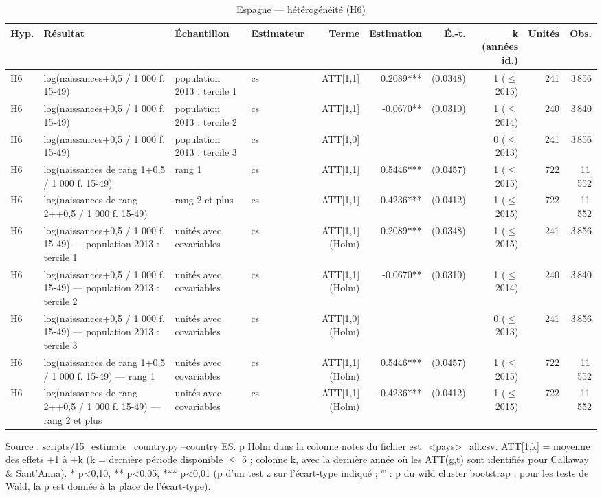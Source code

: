 \begin{table}\centering
\begin{threeparttable}
\caption{Espagne — hétérogénéité (H6)}\label{tab:es_h6}
\scriptsize
\begin{tabular}{lp{7.5cm}llrrrrrr}
\toprule
Hyp. & Résultat & Échantillon & Estimateur & Terme & Estimation & É.-t. & k (années id.) & Unités & Obs. \\
\midrule
H6 & log(naissances+0,5 / 1 000 f. 15-49) & population 2013 : tercile 1 & cs & ATT[1,1] & 0.2089*** & (0.0348) & 1 ($\leq$ 2015) & 241 & 3\,856 \\
H6 & log(naissances+0,5 / 1 000 f. 15-49) & population 2013 : tercile 2 & cs & ATT[1,1] & -0.0670** & (0.0310) & 1 ($\leq$ 2014) & 240 & 3\,840 \\
H6 & log(naissances+0,5 / 1 000 f. 15-49) & population 2013 : tercile 3 & cs & ATT[1,0] &  &  & 0 ($\leq$ 2013) & 241 & 3\,856 \\
H6 & log(naissances de rang 1+0,5 / 1 000 f. 15-49) & rang 1 & cs & ATT[1,1] & 0.5446*** & (0.0457) & 1 ($\leq$ 2015) & 722 & 11\,552 \\
H6 & log(naissances de rang 2++0,5 / 1 000 f. 15-49) & rang 2 et plus & cs & ATT[1,1] & -0.4236*** & (0.0412) & 1 ($\leq$ 2015) & 722 & 11\,552 \\
H6 & log(naissances+0,5 / 1 000 f. 15-49) — population 2013 : tercile 1 & unités avec covariables & cs & ATT[1,1] (Holm) & 0.2089*** & (0.0348) & 1 ($\leq$ 2015) & 241 & 3\,856 \\
H6 & log(naissances+0,5 / 1 000 f. 15-49) — population 2013 : tercile 2 & unités avec covariables & cs & ATT[1,1] (Holm) & -0.0670** & (0.0310) & 1 ($\leq$ 2014) & 240 & 3\,840 \\
H6 & log(naissances+0,5 / 1 000 f. 15-49) — population 2013 : tercile 3 & unités avec covariables & cs & ATT[1,0] (Holm) &  &  & 0 ($\leq$ 2013) & 241 & 3\,856 \\
H6 & log(naissances de rang 1+0,5 / 1 000 f. 15-49) — rang 1 & unités avec covariables & cs & ATT[1,1] (Holm) & 0.5446*** & (0.0457) & 1 ($\leq$ 2015) & 722 & 11\,552 \\
H6 & log(naissances de rang 2++0,5 / 1 000 f. 15-49) — rang 2 et plus & unités avec covariables & cs & ATT[1,1] (Holm) & -0.4236*** & (0.0412) & 1 ($\leq$ 2015) & 722 & 11\,552 \\
\bottomrule
\end{tabular}
\begin{tablenotes}\footnotesize
\item Source : scripts/15\_estimate\_country.py --country ES. p Holm dans la colonne notes du fichier est\_<pays>\_all.csv. ATT[1,k] = moyenne des effets +1 à +k (k = dernière période disponible $\leq$ 5 ; colonne k, avec la dernière année où les ATT(g,t) sont identifiés pour Callaway \& Sant'Anna). * p<0,10, ** p<0,05, *** p<0,01 (p d'un test z sur l'écart-type indiqué ; $^{w}$ : p du wild cluster bootstrap ; pour les tests de Wald, la p est donnée à la place de l'écart-type).
\end{tablenotes}
\end{threeparttable}
\end{table}
